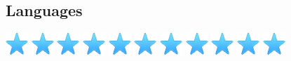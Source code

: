 \documentclass[]{cv-class}
\begin{document}
\begin{aside}
  \vspace{1cm}
  \section{Languages}
    {\includegraphics[scale=0.30]{img/star.png}
    \includegraphics[scale=0.30]{img/star.png}
    \includegraphics[scale=0.30]{img/star.png}
    \includegraphics[scale=0.30]{img/star.png}
    \includegraphics[scale=0.30]{img/star.png}}
    {\includegraphics[scale=0.30]{img/star.png}
    \includegraphics[scale=0.30]{img/star.png}
    \includegraphics[scale=0.30]{img/star.png}
    \includegraphics[scale=0.30]{img/star.png}
    \includegraphics[scale=0.30]{img/star.png}}
    {\includegraphics[scale=0.30]{img/star.png}
}
\end{aside}
\end{document}
